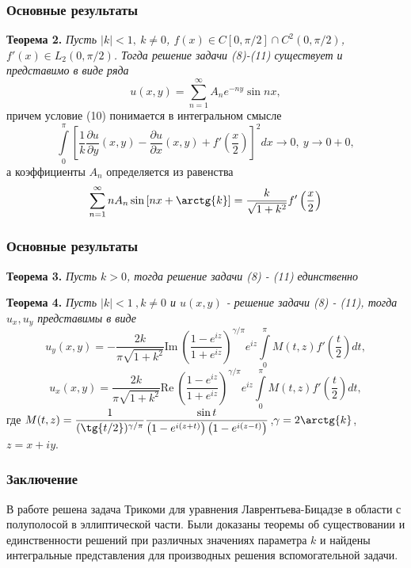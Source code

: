 \documentclass{beamer}
\begin{document}
	\begin{frame}
		\frametitle{Основные результаты}
			\textbf{Теорема 2.} \textit{Пусть $|k| < 1, \ k \neq 0$, $f(x) \in C[0, \pi/2] \cap C^2(0, \pi/2)$, $f'(x) \in L_2(0, \pi/2)$. Тогда решение задачи (8)-(11) существует и представимо в виде ряда
				\begin{equation*}
					u(x,y) = \sum\limits_{n=1}^{\infty} A_n e^{-ny} \sin{nx},
			\end{equation*}}
			причем условие (10) понимается в интегральном смысле
			\[
				\int\limits_0^\pi \left[	\dfrac{1}{k} \dfrac{\partial u}{\partial y}(x,y) - \dfrac{\partial u}{\partial x}(x,y) + f'\left(\dfrac{x}{2}\right)\right]^2 dx \to 0, \ y \to 0 + 0,
			\]
			а коэффициенты $A_n$ определяется из равенства
			\[
				\sum\limits_{n=1}^{\infty} n A_n \sin{\left[nx + \arctg{k}\right]} = \dfrac{k}{\sqrt{1 + k^2}} f'\left(\dfrac{x}{2}\right) 
			\]
	\end{frame}
	
	\begin{frame}
		\frametitle{Основные результаты}
		\textbf{Теорема 3.} \textit{Пусть $k > 0$, тогда решение задачи (8) - (11) единственно}
		
\textbf{Теорема 4.} \textit{Пусть $|k| < 1\  , k \neq 0$ и $u(x,y)$  - решение задачи (8) - (11), тогда $u_x, u_y$ представимы в виде}
\begin{equation*}
	u_y(x,y) = -\dfrac{2k}{\pi\sqrt{1+k^2}} \mathrm{Im}\ \left(\dfrac{1- e^{iz}}{1 + e^{iz}} \right)^{\gamma/\pi} e^{iz}\int\limits_0^\pi M(t,z) f'(\dfrac{t}{2}) dt, 
\end{equation*}
\begin{equation*}
	u_x(x,y) = \dfrac{2k}{\pi\sqrt{1+k^2}} \mathrm{Re}\ \left(\dfrac{1- e^{iz}}{1 + e^{iz}} \right)^{\gamma/\pi} e^{iz}\int\limits_0^\pi M(t,z)  f'(\dfrac{t}{2}) dt,
\end{equation*}
где $M(t,z) = \dfrac{1}{(\tg{t/2})^{\gamma/\pi}}  \dfrac{ \sin{t}}{\left(1 - e^{i(z+t)} \right) \left(1 - e^{i(z-t)}\right)}$,$\gamma = 2\arctg{k}$, $z = x + iy$.
	\end{frame}
	
	
	\begin{frame}
		\frametitle{Заключение}
		В работе решена задача Трикоми для уравнения Лаврентьева-Бицадзе в области с полуполосой в эллиптической части. Были доказаны теоремы об существовании и единственности решений при различных значениях параметра $k$ и найдены интегральные представления для производных решения вспомогательной задачи.
	\end{frame}
	
\end{document}
